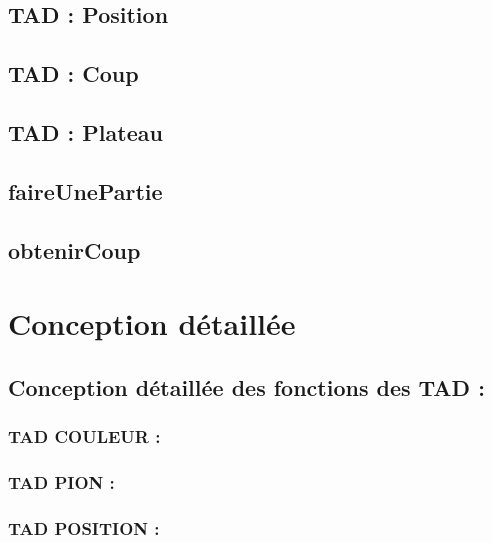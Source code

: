 \documentclass{article}
\begin{document}
\subsection{TAD : Position}


\subsection{TAD : Coup}


\subsection{TAD : Plateau}


\subsection{faireUnePartie}


\subsection{obtenirCoup}


\newpage

\section{Conception détaillée}
\subsection{Conception détaillée des fonctions des TAD :}

\subsubsection{TAD COULEUR :}


\subsubsection{TAD PION :}


\subsubsection{TAD POSITION :}

\end{document}
